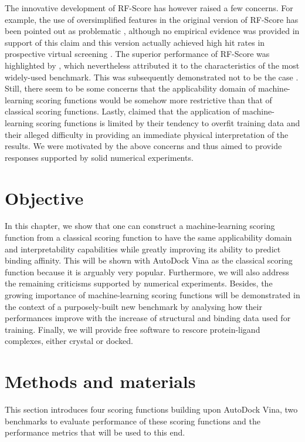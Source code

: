 The innovative development of RF-Score has however raised a few concerns. For example, the use of oversimplified features in the original version of RF-Score has been pointed out as problematic \citep{1453}, although no empirical evidence was provided in support of this claim and this version actually achieved high hit rates in prospective virtual screening \citep{1281}. The superior performance of RF-Score was highlighted by \citep{774}, which nevertheless attributed it to the characteristics of the most widely-used benchmark. This was subsequently demonstrated not to be the case \citep{908}. Still, there seem to be some concerns that the applicability domain of machine-learning scoring functions would be somehow more restrictive than that of classical scoring functions. Lastly, \citep{1372} claimed that the application of machine-learning scoring functions is limited by their tendency to overfit training data and their alleged difficulty in providing an immediate physical interpretation of the results. We were motivated by the above concerns and thus aimed to provide responses supported by solid numerical experiments.

\section{Objective}

In this chapter, we show that one can construct a machine-learning scoring function from a classical scoring function to have the same applicability domain and interpretability capabilities while greatly improving its ability to predict binding affinity. This will be shown with AutoDock Vina \citep{595} as the classical scoring function because it is arguably very popular. Furthermore, we will also address the remaining criticisms supported by numerical experiments. Besides, the growing importance of machine-learning scoring functions will be demonstrated in the context of a purposely-built new benchmark by analysing how their performances improve with the increase of structural and binding data used for training. Finally, we will provide free software to rescore protein-ligand complexes, either crystal or docked.

\section{Methods and materials}

This section introduces four scoring functions building upon AutoDock Vina, two benchmarks to evaluate performance of these scoring functions and the performance metrics that will be used to this end.

